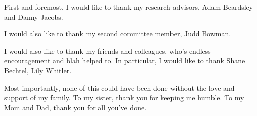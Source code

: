 First and foremost, I would like to thank my research advisors, Adam Beardsley
and Danny Jacobs.

I would also like to thank my second committee member, Judd Bowman.

I would also like to thank my friends and colleagues, who's endless encouragement
and blah helped to. In particular, I would like to thank Shane Bechtel, Lily Whitler.

Most importantly, none of this could have been done without the love and support
of my family. To my sister, thank you for keeping me humble. To my Mom and Dad,
thank you for all you've done.

\clearpage
